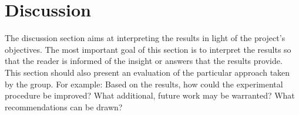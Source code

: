 \section{Discussion}
The discussion section aims at interpreting the results in light of the project's objectives.
The most important goal of this section is to interpret the results so that the reader is informed of the insight or answers that the results provide.
This section should also present an evaluation of the particular approach taken by the group.
For example: Based on the results, how could the experimental procedure be improved?
What additional, future work may be warranted?
What recommendations can be drawn?



